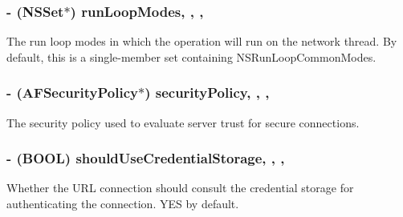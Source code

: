 \subsubsection[{run\+Loop\+Modes}]{\setlength{\rightskip}{0pt plus 5cm}-\/ (N\+S\+Set$\ast$) run\+Loop\+Modes\hspace{0.3cm}{\ttfamily [read]}, {\ttfamily [write]}, {\ttfamily [nonatomic]}, {\ttfamily [strong]}}\label{interface_a_f_u_r_l_connection_operation_ac8a33d7fdd6314e92600318a79d60193}
The run loop modes in which the operation will run on the network thread. By default, this is a single-\/member set containing {\ttfamily N\+S\+Run\+Loop\+Common\+Modes}. \hypertarget{interface_a_f_u_r_l_connection_operation_a7535b654217ef37bc653da145eb537df}{}
\subsubsection[{security\+Policy}]{\setlength{\rightskip}{0pt plus 5cm}-\/ ({\bf A\+F\+Security\+Policy}$\ast$) security\+Policy\hspace{0.3cm}{\ttfamily [read]}, {\ttfamily [write]}, {\ttfamily [nonatomic]}, {\ttfamily [strong]}}\label{interface_a_f_u_r_l_connection_operation_a7535b654217ef37bc653da145eb537df}
The security policy used to evaluate server trust for secure connections. \hypertarget{interface_a_f_u_r_l_connection_operation_a48bd01b0c9afd1f5234d01d28e3764e7}{}
\subsubsection[{should\+Use\+Credential\+Storage}]{\setlength{\rightskip}{0pt plus 5cm}-\/ (B\+O\+O\+L) should\+Use\+Credential\+Storage\hspace{0.3cm}{\ttfamily [read]}, {\ttfamily [write]}, {\ttfamily [nonatomic]}, {\ttfamily [assign]}}\label{interface_a_f_u_r_l_connection_operation_a48bd01b0c9afd1f5234d01d28e3764e7}
Whether the U\+R\+L connection should consult the credential storage for authenticating the connection. {\ttfamily Y\+E\+S} by default.

